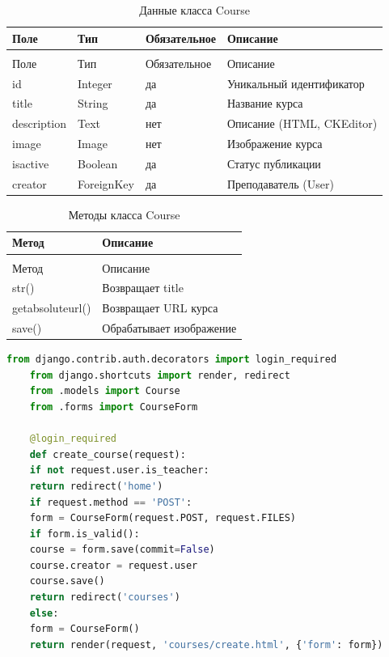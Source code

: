 \begin{xltabular}{\textwidth}{|l|l|l|X|}
	\caption{Данные класса Course\label{tab:course_attributes}}\\
	\hline
	Поле & Тип & Обязательное & Описание \\ \hline
	\endfirsthead
	\\
	\hline
	Поле & Тип & Обязательное & Описание \\ \hline
	\endhead
	id & Integer & да & Уникальный идентификатор \\ \hline
	title & String & да & Название курса \\ \hline
	description & Text & нет & Описание (HTML, CKEditor) \\ \hline
	image & Image & нет & Изображение курса \\ \hline
	isactive & Boolean & да & Статус публикации \\ \hline
	creator & ForeignKey & да & Преподаватель (User) \\ \hline
\end{xltabular}

\begin{xltabular}{\textwidth}{|l|X|}
	\caption{Методы класса Course\label{tab:course_methods}}\\
	\hline
	Метод & Описание \\ \hline
	\endfirsthead
	\\
	\hline
	Метод & Описание \\ \hline
	\endhead
	str() & Возвращает title \\ \hline
	getabsoluteurl() & Возвращает URL курса \\ \hline
	save() & Обрабатывает изображение \\ \hline
\end{xltabular}

\begin{lstlisting}[language=Python, caption=Представление для создания курса, label=lst:course_view]
	from django.contrib.auth.decorators import login_required
	from django.shortcuts import render, redirect
	from .models import Course
	from .forms import CourseForm
	
	@login_required
	def create_course(request):
	if not request.user.is_teacher:
	return redirect('home')
	if request.method == 'POST':
	form = CourseForm(request.POST, request.FILES)
	if form.is_valid():
	course = form.save(commit=False)
	course.creator = request.user
	course.save()
	return redirect('courses')
	else:
	form = CourseForm()
	return render(request, 'courses/create.html', {'form': form})
\end{lstlisting}

